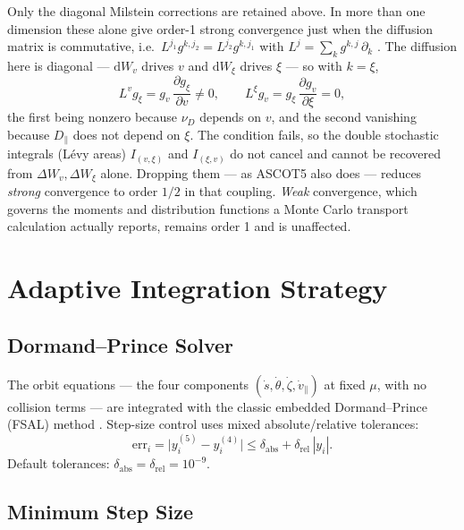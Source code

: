 \documentclass[11pt]{article}
\newcommand{\vpar}{v_{\!\parallel}}
\newcommand{\dd}{\mathrm{d}}
\begin{document}
Only the diagonal Milstein corrections are retained above.  In more than one
dimension these alone give order-1 strong convergence just when the diffusion
matrix is commutative, i.e.\ $L^{j_1}g^{k,j_2} = L^{j_2}g^{k,j_1}$ with
$L^{j} = \sum_k g^{k,j}\,\partial_k$ \cite{kloeden1992}.  The diffusion here is
diagonal --- $\dd W_v$ drives $v$ and $\dd W_\xi$ drives $\xi$ --- so with
$k=\xi$,
\begin{equation}
  L^{v}g_\xi = g_v\,\frac{\partial g_\xi}{\partial v} \neq 0,
  \qquad
  L^{\xi}g_v = g_\xi\,\frac{\partial g_v}{\partial \xi} = 0 ,
\end{equation}
the first being nonzero because $\nu_D$ depends on $v$, and the second
vanishing because $D_\parallel$ does not depend on $\xi$.  The condition fails,
so the double stochastic integrals (L\'evy areas) $I_{(v,\xi)}$ and
$I_{(\xi,v)}$ do not cancel and cannot be recovered from
$\Delta W_v,\Delta W_\xi$ alone.  Dropping them --- as ASCOT5 also does ---
reduces \emph{strong} convergence to order $1/2$ in that coupling.
\emph{Weak} convergence, which governs the moments and distribution functions
a Monte Carlo transport calculation actually reports, remains order 1 and is
unaffected.

\section{Adaptive Integration Strategy}

\subsection{Dormand--Prince Solver}

The orbit equations --- the four components $(\dot s,\dot\theta,\dot\zeta,\dot\vpar)$
at fixed $\mu$, with no collision terms --- are integrated with the classic embedded
Dormand--Prince (FSAL) method \cite{dormand1980}.
Step-size control uses mixed absolute/relative tolerances:
\begin{equation}
  \mathrm{err}_i = \bigl|y_i^{(5)} - y_i^{(4)}\bigr|
  \leq \delta_{\mathrm{abs}} + \delta_{\mathrm{rel}}\,|y_i|.
\end{equation}
Default tolerances: $\delta_{\mathrm{abs}}=\delta_{\mathrm{rel}}=10^{-9}$.

\subsection{Minimum Step Size}
\end{document}

